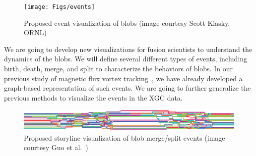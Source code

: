 \begin{figure}[!h]
  \centering
  \texttt{[image: Figs/events]}
  \caption{Proposed event visualization of blobs (image courtesy Scott Klasky, ORNL)}
  \label{fig:events}
\end{figure}

We are going to develop new visualizations for fusion scientists to understand the dynamics of the blobs.  We will define several different types of events, including birth, death, merge, and split to characterize the behaviors of blobs.  In our previous study of magnetic flux vortex tracking~\cite{GuoPPKG16, GuoPG17, PhillipsGPKG16, PhillipsPKG15}, we have already developed a graph-based representation of such events.  We are going to further generalize the previous methods to visualize the events in the XGC data.  

\begin{figure}[!h]
  \centering
  \includegraphics[width=\linewidth]{Figs/storyline}
  \caption{Proposed storyline visualization of blob merge/split events (image courtesy Guo et al.~\cite{GuoPPKG16})}
  \label{fig:storyline}
\end{figure}

% 


% 

